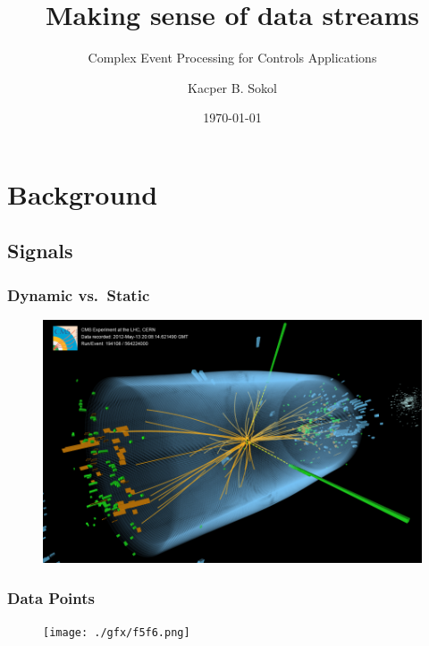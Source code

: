 \documentclass{beamer}
\begin{document}
\title{Making sense of data streams}
\subtitle{Complex Event Processing for Controls Applications}
\author{Kacper B. Sokol}
\date{\today}

\begin{frame}[plain]
	\titlepage
\end{frame}



\section{Background} 
  \subsection{Signals}
  \begin{frame}[foot]
    \frametitle{Dynamic vs.\ Static}
    \begin{figure}
      \includegraphics[scale=.7]{./gfx/CMS.png}
    \end{figure}
  \end{frame}

  \begin{frame}[foot]
    \frametitle{Data Points}
    \begin{figure}
      \texttt{[image: ./gfx/f5f6.png]}
    \end{figure}
  \end{frame}
\end{document}
